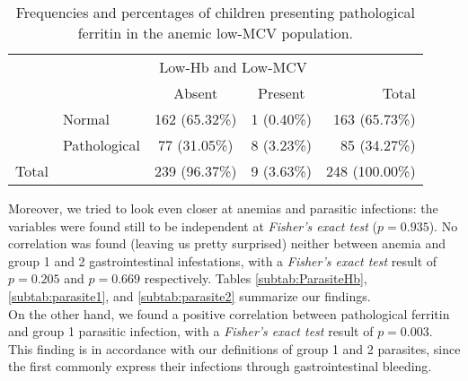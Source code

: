 \begin{table}[H]
   \centering
   \begin{tabular}{c l c c | r}
   	  & & \multicolumn{2}{c}{Low-Hb and Low-MCV} & \\
   	  \cline{3-4}
       & & Absent & Present & Total\\
      \hline
       \parbox[t]{2mm}{} & Normal & 162 (65.32\%) & 1 (0.40\%) & 163 (65.73\%)\\
       & Pathological & 77 (31.05\%) & 8 (3.23\%) & 85 (34.27\%)\\
      \hline
      Total & & 239 (96.37\%) & 9 (3.63\%) & 248 (100.00\%)\\
   \end{tabular}
   \caption{Frequencies and percentages of children presenting pathological ferritin in the anemic low-MCV population.}
    \label{tab:Ferritin_HbMCV}
\end{table}

Moreover, we tried to look even closer at anemias and parasitic infections: the variables were found still to be independent at \textit{Fisher's exact test} ($p=0.935$). No correlation was found (leaving us pretty surprised) neither between anemia and group 1 and 2 gastrointestinal infestations, with a \textit{Fisher's exact test} result of $p=0.205$ and $p=0.669$ respectively. Tables \ref{subtab:ParasiteHb}, \ref{subtab:parasite1}, and \ref{subtab:parasite2} summarize our findings.\\
On the other hand, we found a positive correlation between pathological ferritin and group 1 parasitic infection, with a \textit{Fisher's exact test} result of $p=0.003$. This finding is in accordance with our definitions of group 1 and 2 parasites, since the first commonly express their infections through gastrointestinal bleeding.


